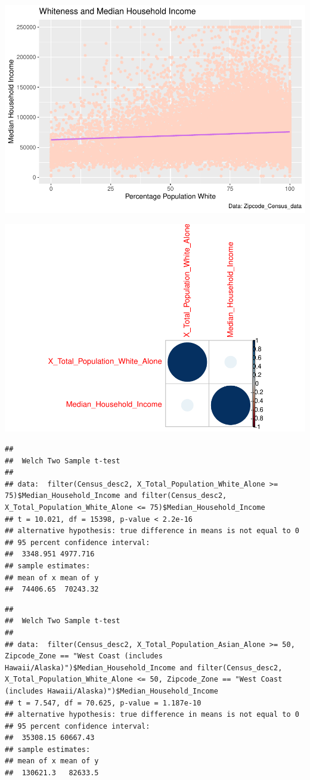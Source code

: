 \documentclass[
  man]{apa6}
\begin{document}
\includegraphics{Zip_Analysis_files/figure-latex/whiteness-income-plot-1.pdf}

\includegraphics{Zip_Analysis_files/figure-latex/unnamed-chunk-3-1.pdf}

\begin{verbatim}
## 
##  Welch Two Sample t-test
## 
## data:  filter(Census_desc2, X_Total_Population_White_Alone >= 75)$Median_Household_Income and filter(Census_desc2, X_Total_Population_White_Alone <= 75)$Median_Household_Income
## t = 10.021, df = 15398, p-value < 2.2e-16
## alternative hypothesis: true difference in means is not equal to 0
## 95 percent confidence interval:
##  3348.951 4977.716
## sample estimates:
## mean of x mean of y 
##  74406.65  70243.32
\end{verbatim}

\begin{verbatim}
## 
##  Welch Two Sample t-test
## 
## data:  filter(Census_desc2, X_Total_Population_Asian_Alone >= 50, Zipcode_Zone == "West Coast (includes Hawaii/Alaska)")$Median_Household_Income and filter(Census_desc2, X_Total_Population_White_Alone <= 50, Zipcode_Zone == "West Coast (includes Hawaii/Alaska)")$Median_Household_Income
## t = 7.547, df = 70.625, p-value = 1.187e-10
## alternative hypothesis: true difference in means is not equal to 0
## 95 percent confidence interval:
##  35308.15 60667.43
## sample estimates:
## mean of x mean of y 
##  130621.3   82633.5
\end{verbatim}
\end{document}
